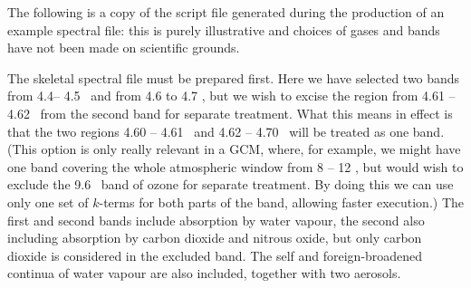 \label{sec:ex_spf}

The following is a copy of the script file generated during the production
of an example spectral file: this is purely illustrative and choices of gases
and bands have not been made on scientific grounds.

The skeletal spectral file must be prepared first. Here we have selected 
two bands from 4.4-- 4.5 \um\ and from 4.6 to 4.7 \um, but we wish to excise
the region from 4.61 -- 4.62 \um\ from the second band for separate treatment.
What this means in effect is that the two regions 4.60 -- 4.61 \um\ and
4.62 -- 4.70 \um\ will be treated as one band. (This option is only really
relevant in a GCM, where, for example, we might have one band covering 
the whole atmospheric window from 8 -- 12 \um, but would wish to exclude 
the 9.6 \um\ band of ozone for separate treatment. By doing this we can use only
one set of $k$-terms for both parts of the band, allowing faster execution.)
The first and second bands include absorption by water vapour, the second
also including absorption by carbon dioxide and nitrous oxide, but only
carbon dioxide is considered in the excluded band. The self and 
foreign-broadened continua of water vapour are also included, together with 
two aerosols.

